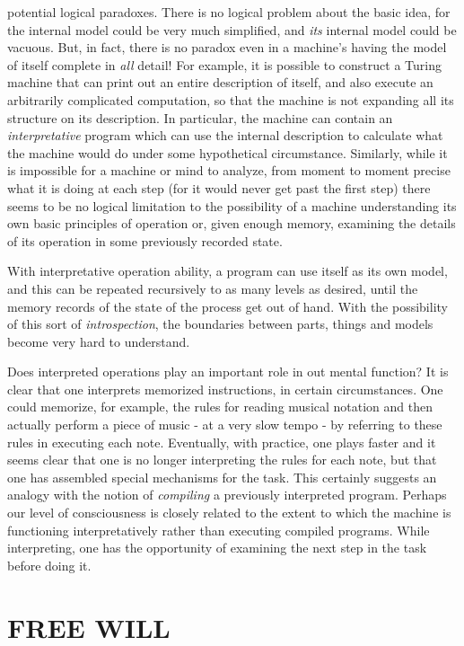 \documentclass{article}
\begin{document}
potential logical paradoxes. There is no logical problem about the basic idea, for the internal model could be very much simplified, and \textit{its} internal model could be vacuous. But, in fact, there is no paradox even in a machine's having the model of itself complete in \textit{all} detail! For example, it is possible to construct a Turing machine that can print out an entire description of itself, and also execute an arbitrarily complicated computation, so that the machine is not expanding all its structure on its description. In particular, the machine can contain an \textit{interpretative} program which can use the internal description to calculate what the machine would do under some hypothetical circumstance. Similarly, while it is impossible for a machine or mind to analyze, from moment to moment precise what it is doing at each step (for it would never get past the first step) there seems to be no logical limitation to the possibility of a machine understanding its own basic principles of operation or, given enough memory, examining the details of its operation in some previously recorded state.

With interpretative operation ability, a program can use itself as its own model, and this can be repeated recursively to as many levels as desired, until the memory records of the state of the process get out of hand. With the possibility of this sort of \textit{introspection}, the boundaries between parts, things and models become very hard to understand.

Does interpreted operations play an important role in out mental function? It is clear that one interprets memorized instructions, in certain circumstances. One could memorize, for example, the rules for reading musical notation and then actually perform a piece of music - at a very slow tempo - by referring to these rules in executing each note. Eventually, with practice, one plays faster and it seems clear that one is no longer interpreting the rules for each note, but that one has assembled special mechanisms for the task. This certainly suggests an analogy with the notion of \textit{compiling} a previously interpreted program. Perhaps our level of consciousness is closely related to the extent to which the machine is functioning interpretatively rather than executing compiled programs. While interpreting, one has the opportunity of examining the next step in the task before doing it.

\section*{FREE WILL}
\end{document}

